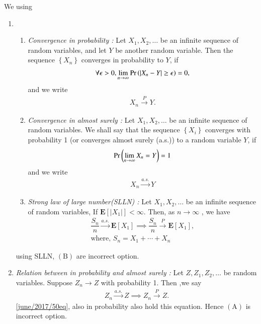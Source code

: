 We using
\begin{enumerate}[label=\alph*)]
\item 
\begin{enumerate}[label=(\arabic*)]
\item {\em Convergence in probability : }Let $X_{1}, X_{2}, \ldots$ be an infinite sequence of random variables, and let $Y$ be another random variable. Then the sequence $\left\{X_{n}\right\}$ converges in probability to $Y$, if
\begin{align}
\forall \epsilon>0, \lim _{n \rightarrow \infty} \Pr\left(\left|X_{n}-Y\right| \geq \epsilon\right)=0,
\end{align}
and we write 
\begin{align}
X_{n} \stackrel{P}{\rightarrow} Y.
\end{align}
\item {\em Convergence in almost surely : }Let $X_{1}, X_{2}, \ldots$ be an infinite sequence of random variables. We shall say that the sequence $\left\{X_{i}\right\}$ converges with probability 1 (or converges almost surely (a.s.)) to a random variable $Y$, if 
\begin{align}
\Pr\left(\lim _{n \rightarrow \infty} X_{n}=Y\right)=1
\end{align}
and we write
\begin{align}
X_{n} \stackrel{a . s .}{\rightarrow} Y
\end{align}
\item {\em Strong law of large number(SLLN) : }Let $X_{1}, X_{2}, \ldots$ be an infinite sequence of random variables, If $\mathbf{E}\left[\left|X_{1}\right|\right]<\infty$. Then, as $n \rightarrow \infty$ , we have 
\begin{align}
\dfrac{S_{n}}{n} \stackrel{a.s.}{\rightarrow} \mathbf{E}\left[X_{1}\right]\implies \dfrac{S_{n}}{n} \stackrel{P}{\rightarrow} \mathbf{E}\left[X_{1}\right],
\label{june/2017/50eq} \\
\text{where} ,\,S_n = X_1 + \cdots + X_n
\end{align}  
\end{enumerate}
using SLLN, $(\mathrm{B})$ are incorrect option.
\item {\em Relation between in probability and almost surely : }Let $Z, Z_{1}, Z_{2}, \ldots$ be random variables. Suppose $Z_{n} \rightarrow Z$ with probability 1. Then ,we say 
\begin{align}
 Z_n \stackrel{a.s.}{\rightarrow} Z \implies Z_n \stackrel{P}{\rightarrow} Z.
\end{align}
\eqref{june/2017/50eq}, also in probability also hold this equation. Hence $(\mathrm{A})$ is incorrect option.  

\end{enumerate}
